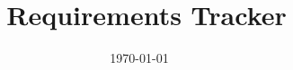 \documentclass[]{beamer}
\title{\amanzi\ Requirements Tracker}
\author[\href{http://www.lanl.gov/library/find/reports/index.php}{LA-UR-2018xxxx} \qquad \qquad \qquad \qquad \quad \Topa]{\authorTopa}
\institute[CCS-2]{\href{http://www.lanl.gov/org/padste/adtsc/computer-computational-statistical-sciences/computational-physics-methods/index.php}{CCS-2: Computational Physics and Methods} \\ 
\medskip
\textit{dantopa@lanl.gov}
}
\date{\today}
\begin{document}
	\begin{frame}
		\titlepage
	\end{frame}


%

\end{document}
